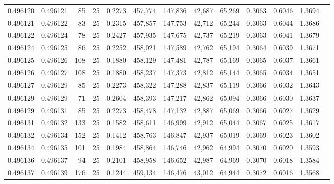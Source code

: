 \begin{tabular}{rrrrrrrrrrrrr}
0.496120 & 0.496121 &    85 &  25 &                                     0.2273 & 457,774 & 147,836 &  42,687 &  65,269 & 0.3063 & 0.6046 & 1.3694 \\
0.496121 & 0.496122 &    83 &  25 &                                     0.2315 & 457,857 & 147,753 &  42,712 &  65,244 & 0.3063 & 0.6044 & 1.3686 \\
0.496122 & 0.496124 &    78 &  25 &                                     0.2427 & 457,935 & 147,675 &  42,737 &  65,219 & 0.3063 & 0.6041 & 1.3679 \\
0.496124 & 0.496125 &    86 &  25 &                                     0.2252 & 458,021 & 147,589 &  42,762 &  65,194 & 0.3064 & 0.6039 & 1.3671 \\
0.496125 & 0.496126 &   108 &  25 &                                     0.1880 & 458,129 & 147,481 &  42,787 &  65,169 & 0.3065 & 0.6037 & 1.3661 \\
0.496126 & 0.496127 &   108 &  25 &                                     0.1880 & 458,237 & 147,373 &  42,812 &  65,144 & 0.3065 & 0.6034 & 1.3651 \\
0.496127 & 0.496129 &    85 &  25 &                                     0.2273 & 458,322 & 147,288 &  42,837 &  65,119 & 0.3066 & 0.6032 & 1.3643 \\
0.496129 & 0.496129 &    71 &  25 &                                     0.2604 & 458,393 & 147,217 &  42,862 &  65,094 & 0.3066 & 0.6030 & 1.3637 \\
0.496129 & 0.496131 &    85 &  25 &                                     0.2273 & 458,478 & 147,132 &  42,887 &  65,069 & 0.3066 & 0.6027 & 1.3629 \\
0.496131 & 0.496132 &   133 &  25 &                                     0.1582 & 458,611 & 146,999 &  42,912 &  65,044 & 0.3067 & 0.6025 & 1.3617 \\
0.496132 & 0.496134 &   152 &  25 &                                     0.1412 & 458,763 & 146,847 &  42,937 &  65,019 & 0.3069 & 0.6023 & 1.3602 \\
0.496134 & 0.496135 &   101 &  25 &                                     0.1984 & 458,864 & 146,746 &  42,962 &  64,994 & 0.3070 & 0.6020 & 1.3593 \\
0.496136 & 0.496137 &    94 &  25 &                                     0.2101 & 458,958 & 146,652 &  42,987 &  64,969 & 0.3070 & 0.6018 & 1.3584 \\
0.496137 & 0.496139 &   176 &  25 &                                     0.1244 & 459,134 & 146,476 &  43,012 &  64,944 & 0.3072 & 0.6016 & 1.3568 \\

\end{tabular}
